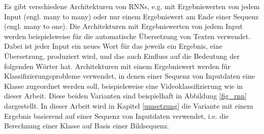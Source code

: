 Es gibt verschiedene Architekturen von \acp{RNN}, e.g. mit Ergebniswerten von jedem Input (engl. many to many) oder nur einem Ergebniswert am Ende einer Sequenz (engl. many to one). Die Architekturen mit Ergebniswerten von jedem Input werden beispielsweise für die automatische Übersetzung von Texten verwendet. Dabei ist jeder Input ein neues Wort für das jeweils ein Ergebnis, eine Übersetzung, produziert wird, und das auch Einfluss auf die Bedeutung der folgenden Wörter hat. Architekturen mit einem Ergebniswert werden für Klassifizierungsprobleme verwendet, in denen einer Sequenz von Inputdaten eine Klasse zugeordnet werden soll, beispielsweise eine Videoklassifizierung wie in dieser Arbeit. Diese beiden Varianten sind beispielhaft in Abbildung \ref{fig_rnn} dargestellt. In dieser Arbeit wird in Kapitel \ref{umsetzung} die Variante mit einem Ergebnis basierend auf einer Sequenz von Inputdaten verwendet, i.e. die Berechnung einer Klasse auf Basis einer Bildsequenz.


